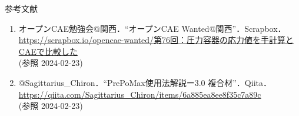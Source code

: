 \begin{frame}{参考文献}
  \begin{enumerate}[label=\textbf{［\arabic*］},itemsep=1ex, leftmargin=1mm]
      \item オープンCAE勉強会@関西．“オープンCAE Wanted@関西”．Scrapbox．\\
          {\footnotesize {} \color{cud_orange}
          \url{https://scrapbox.io/opencae-wanted/第76回：圧力容器の応力値を手計算とCAEで比較した}} \\
          (参照 2024-02-23)
      \item @Sagittarius\_Chiron．“PrePoMax使用法解説ー3.0 複合材”．Qiita．\\
          {\footnotesize {} \color{cud_orange}
          \url{https://qiita.com/Sagittarius_Chiron/items/6a885ea8ee8f35c7a89c}} \\
          (参照 2024-02-23)
  \end{enumerate}
\end{frame}

